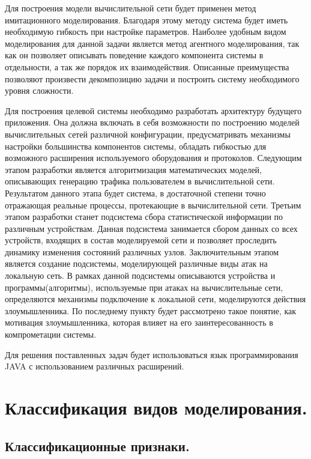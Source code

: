     Для построения модели вычислительной сети будет применен метод имитационного моделирования. Благодаря этому методу система будет иметь необходимую гибкость при настройке параметров. Наиболее удобным видом моделирования для данной задачи является метод агентного моделирования, так как он позволяет описывать поведение каждого компонента системы в отдельности, а так же порядок их взаимодействия. Описанные преимущества позволяют произвести декомпозицию задачи и построить систему необходимого уровня сложности.

    Для построения целевой системы необходимо разработать архитектуру будущего приложения. Она должна включать в себя возможности по построению моделей вычислительных сетей различной конфигурации, предусматривать механизмы настройки большинства компонентов системы, обладать гибкостью для возможного расширения используемого оборудования и протоколов. Следующим этапом разработки является алгоритмизация математических моделей, описывающих генерацию трафика пользователем в вычислительной сети. Результатом данного этапа будет система, в достаточной степени точно отражающая реальные процессы, протекающие в вычислительной сети. Третьим этапом разработки станет подсистема сбора статистической информации по различным устройствам. Данная подсистема занимается сбором данных со всех устройств, входящих в состав моделируемой сети и позволяет проследить динамику изменения состояний различных узлов. Заключительным этапом является создание подсистемы, моделирующей различные виды атак на локальную сеть. В рамках данной подсистемы описываются устройства и программы(алгоритмы), используемые при атаках на вычислительные сети, определяются механизмы подключение к локальной сети, моделируются действия злоумышленника. По последнему пункту будет рассмотрено такое понятие, как мотивация злоумышленника, которая влияет на его заинтересованность в компрометации системы.

    Для решения поставленных задач будет использоваться язык программирования JAVA с использованием различных расширений.




\section{Классификация видов моделирования.}

\subsection{Классификационные признаки.}

